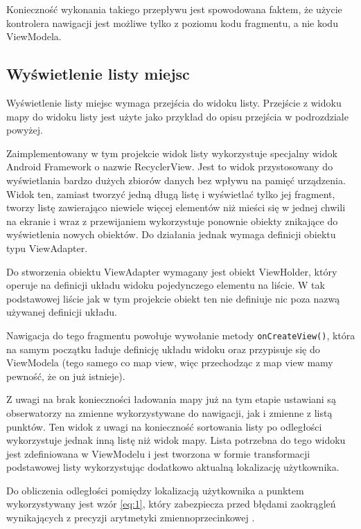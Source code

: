 \documentclass[polish,polish,a4paper,12pt]{article}
\begin{document}
	Konieczność wykonania takiego przepływu jest spowodowana faktem, że użycie kontrolera nawigacji jest możliwe tylko z poziomu kodu fragmentu, a nie kodu ViewModela.

	\subsection{Wyświetlenie listy miejsc}

	Wyświetlenie listy miejsc wymaga przejścia do widoku listy. Przejście z widoku mapy do widoku listy jest użyte jako przykład do opisu przejścia w podrozdziale powyżej.

	Zaimplementowany w tym projekcie widok listy wykorzystuje specjalny widok Android Framework o nazwie RecyclerView. Jest to widok przystosowany do wyświetlania bardzo dużych zbiorów danych bez wpływu na pamięć urządzenia. Widok ten, zamiast tworzyć jedną długą listę i wyświetlać tylko jej fragment, tworzy listę zawierająco niewiele więcej elementów niż mieści się w jednej chwili na ekranie i wraz z przewijaniem wykorzystuje ponownie obiekty znikające do wyświetlenia nowych obiektów. Do działania jednak wymaga definicji obiektu typu ViewAdapter.

	Do stworzenia obiektu ViewAdapter wymagany jest obiekt ViewHolder, który operuje na definicji układu widoku pojedynczego elementu na liście. W tak podstawowej liście jak w tym projekcie obiekt ten nie definiuje nic poza nazwą używanej definicji układu.

	Nawigacja do tego fragmentu powołuje wywołanie metody \texttt{onCreateView()}, która na samym początku ładuje definicję układu widoku oraz przypisuje się do ViewModela (tego samego co map view, więc przechodząc z map view mamy pewność, że on już istnieje).

	Z uwagi na brak konieczności ładowania mapy już na tym etapie ustawiani są obserwatorzy na zmienne wykorzystywane do nawigacji, jak i zmienne z listą punktów. Ten widok z uwagi na konieczność sortowania listy po odległości wykorzystuje jednak inną listę niż widok mapy. Lista potrzebna do tego widoku jest zdefiniowana w ViewModelu i jest tworzona w formie transformacji podstawowej listy wykorzystując dodatkowo aktualną lokalizację użytkownika.

	Do obliczenia odległości pomiędzy lokalizacją użytkownika a punktem wykorzystywany jest wzór \ref{eq:1}, który zabezpiecza przed błędami zaokrągleń wynikających z precyzji arytmetyki zmiennoprzecinkowej \cite{haversineformulawiki}.
\end{document}
